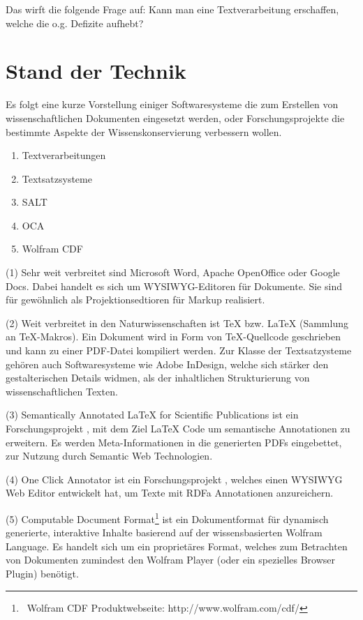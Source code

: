 Das wirft die folgende Frage auf: Kann man eine Textverarbeitung erschaffen, welche die o.g. Defizite aufhebt?

 
\section{Stand der Technik}\label{stand-der-technik}
 
Es folgt eine kurze Vorstellung einiger Softwaresysteme die zum Erstellen von wissenschaftlichen Dokumenten eingesetzt werden, oder Forschungsprojekte die bestimmte Aspekte der Wissenskonservierung verbessern wollen.

 
\begin{enumerate}

\item Textverarbeitungen
\item Textsatzsysteme
\item SALT
\item OCA
\item Wolfram CDF
\end{enumerate}
 
(1) Sehr weit verbreitet sind Microsoft Word, Apache OpenOffice oder Google Docs. Dabei handelt es sich um WYSIWYG-Editoren für Dokumente. Sie sind für gewöhnlich als Projektionsedtioren für Markup realisiert.

 
(2) Weit verbreitet in den Naturwissenschaften ist TeX bzw. LaTeX (Sammlung an TeX-Makros). Ein Dokument wird in Form von TeX-Quellcode geschrieben und kann zu einer PDF-Datei kompiliert werden. Zur Klasse der Textsatzysteme gehören auch Softwaresysteme wie Adobe InDesign, welche sich stärker den gestalterischen Details widmen, als der inhaltlichen Strukturierung von wissenschaftlichen Texten.

 
(3) Semantically Annotated LaTeX for Scientific Publications ist ein Forschungsprojekt \citep{Groza}, mit dem Ziel LaTeX Code um semantische Annotationen zu erweitern. Es werden Meta-Informationen in die generierten PDFs eingebettet, zur Nutzung durch Semantic Web Technologien.

 
(4) One Click Annotator ist ein Forschungsprojekt \citep{Heese}, welches einen WYSIWYG Web Editor entwickelt hat, um Texte mit RDFa Annotationen anzureichern.

 
(5) Computable Document Format\footnote{~Wolfram CDF Produktwebseite: http://www.wolfram.com/cdf/} ist ein Dokumentformat für dynamisch generierte, interaktive Inhalte basierend auf der wissensbasierten Wolfram Language. Es handelt sich um ein proprietäres Format, welches zum Betrachten von Dokumenten zumindest den Wolfram Player (oder ein spezielles Browser Plugin) benötigt.

